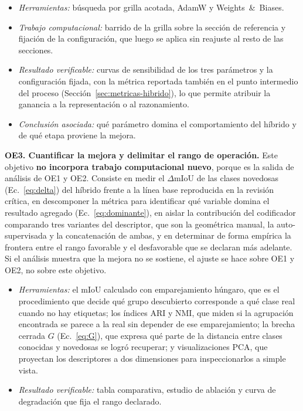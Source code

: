 \begin{itemize}
\item \textit{Herramientas:} búsqueda por grilla acotada, AdamW y
Weights~\&~Biases.
\item \textit{Trabajo computacional:} barrido de la grilla sobre la sección de
referencia y fijación de la configuración, que luego se aplica sin reajuste al
resto de las secciones.
\item \textit{Resultado verificable:} curvas de sensibilidad de los tres
parámetros y la configuración fijada, con la métrica reportada también en el
punto intermedio del proceso (Sección~\ref{sec:metricas-hibrido}), lo que permite
atribuir la ganancia a la representación o al razonamiento.
\item \textit{Conclusión asociada:} qué parámetro domina el comportamiento del
híbrido y de qué etapa proviene la mejora.
\end{itemize}

\medskip
\noindent\textbf{OE3. Cuantificar la mejora y delimitar el rango de operación.}
Este objetivo \textbf{no incorpora trabajo computacional nuevo}, porque es la
salida de análisis de OE1 y OE2. Consiste en medir el $\Delta$mIoU de las clases
novedosas (Ec.~\eqref{eq:delta}) del híbrido frente a la línea base reproducida
en la revisión crítica, en descomponer la métrica para identificar qué variable
domina el resultado agregado (Ec.~\eqref{eq:dominante}), en aislar la
contribución del codificador comparando tres variantes del descriptor, que son la
geométrica manual, la auto-supervisada y la concatenación de ambas, y en
determinar de forma empírica la frontera entre el rango favorable y el
desfavorable que se declaran más adelante. Si el análisis muestra que la mejora no
se sostiene, el ajuste se hace sobre OE1 y OE2, no sobre este objetivo.

\begin{itemize}
\item \textit{Herramientas:} el mIoU calculado con emparejamiento húngaro, que es
el procedimiento que decide qué grupo descubierto corresponde a qué clase real
cuando no hay etiquetas; los índices ARI y NMI, que miden si la agrupación
encontrada se parece a la real sin depender de ese emparejamiento; la brecha
cerrada $G$ (Ec.~\eqref{eq:G}), que expresa qué parte de la distancia entre
clases conocidas y novedosas se logró recuperar; y visualizaciones PCA, que
proyectan los descriptores a dos dimensiones para inspeccionarlos a simple vista.
\item \textit{Resultado verificable:} tabla comparativa, estudio de ablación y
curva de degradación que fija el rango declarado.
\end{itemize}

